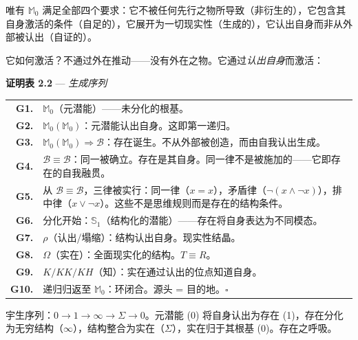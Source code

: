 \documentclass[10pt, openany, oneside]{book}
\begin{document}
\vspace{0.8em}

\noindent 唯有 $\mathbb{M}_0$ 满足全部四个要求：它不被任何先行之物所导致（非衍生的），它包含其自身激活的条件（自足的），它展开为一切现实性（生成的），它认出自身而非从外部被认出（自证的）。

它如何激活？不通过外在推动——没有外在之物。它通过\textit{认出自身}而激活：

\vspace{0.5em}

\textbf{证明表 2.2} --- \textit{生成序列}

\vspace{0.5em}

\noindent\begin{tabular}{r p{}}
\textbf{G1.} & $\mathbb{M}_0$（元潜能）——未分化的根基。\\[0.3em]
\textbf{G2.} & $\mathbb{M}_0(\mathbb{M}_0)$：元潜能认出自身。这即第一递归。\\[0.3em]
\textbf{G3.} & $\mathbb{M}_0(\mathbb{M}_0) \Rightarrow \mathcal{B}$：存在诞生。不从外部被创造，而由自我认出生成。\\[0.3em]
\textbf{G4.} & $\mathcal{B} \equiv \mathcal{B}$：同一被确立。存在是其自身。同一律不是被施加的——它即存在的自我融贯。\\[0.3em]
\textbf{G5.} & 从 $\mathcal{B} \equiv \mathcal{B}$，三律被实行：同一律（$x = x$），矛盾律（$\neg(x \wedge \neg x)$），排中律（$x \vee \neg x$）。这些不是思维规则而是存在的结构条件。\\[0.3em]
\textbf{G6.} & 分化开始：$\mathbb{S}_1$（结构化的潜能）——存在将自身表达为不同模态。\\[0.3em]
\textbf{G7.} & $\rho$（认出/塌缩）：结构认出自身。现实性结晶。\\[0.3em]
\textbf{G8.} & $\Omega$（实在）：全面现实化的结构。$T \equiv R$。\\[0.3em]
\textbf{G9.} & $K/KK/KH$（知）：实在通过认出的位点知道自身。\\[0.3em]
\textbf{G10.} & 递归归返至 $\mathbb{M}_0$：环闭合。源头 = 目的地。$\square$ \\[0.3em]
\end{tabular}

\vspace{0.8em}

\noindent 宇生序列：$0 \to 1 \to \infty \to \Sigma \to 0$。元潜能 (0) 将自身认出为存在 (1)，存在分化为无穷结构（$\infty$），结构整合为实在（$\Sigma$），实在归于其根基 (0)。存在之呼吸。
\end{document}
